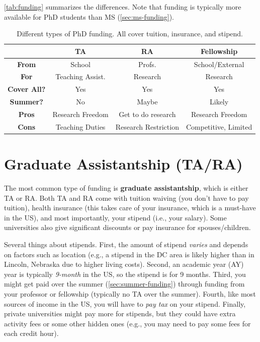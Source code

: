 \documentclass[oneside,11pt,dvipsnames]{book}
\begin{document}
\autoref{tab:funding} summarizes the differences.
Note that funding is typically more available for PhD students than MS (\autoref{sec:ms-funding}).

\begin{table}
  \centering
  \small
  \caption{Different types of PhD funding. All cover tuition, insurance, and stipend.}\label{tab:funding}
  \begin{tabular}{c|c|c|c}
    \toprule
    &\textbf{TA}&\textbf{RA}&\textbf{Fellowship}\\
    \midrule
    \textbf{From} & School & Profs. & School/External\\
    \textbf{For}                  & Teaching Assist.       & Research                        & Research                              \\
    \textbf{Cover All?} & Yes                      & Yes                             & Yes                                   \\
    \textbf{Summer?}              & No                       & Maybe                           & Likely                                   \\
    \midrule
    \textbf{Pros}                 & Research Freedom         & Get to do research              & Research Freedom                      \\
    \textbf{Cons}                 & Teaching Duties           & Research Restriction & Competitive, Limited             \\
    \bottomrule
  \end{tabular}
\end{table}

\section{Graduate Assistantship (TA/RA)}\label{sec:ta-ra}
The most common type of funding is \textbf{graduate assistantship}, which is either TA or RA. Both TA and RA come with tuition waiving (you don't have to pay tuition), health insurance (this takes care of your insurance, which is a must-have in the US), and most importantly, your stipend (i.e., your salary). Some universities also give significant discounts or pay insurance for spouses/children.

Several things about stipends.  First, the amount of stipend \emph{varies} and depends on factors such as location (e.g., a stipend in the DC area is likely higher than in Lincoln, Nebraska due to higher living costs). Second, an academic year (AY)  year is typically \emph{9-month} in the US, so the stipend is for 9 months. Third, you might get paid over the summer (\autoref{sec:summer-funding}) through funding from your professor or fellowship (typically no TA over the summer). Fourth, like most sources of income in the US, you will have to \emph{pay tax} on your stipend.  Finally, private universities might pay more for stipends, but they could have extra activity fees or some other hidden ones (e.g., you may need to pay some fees for each credit hour).
\end{document}
